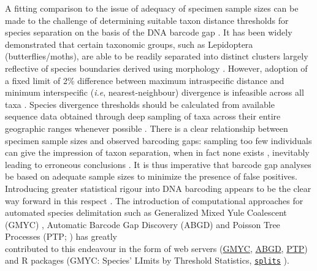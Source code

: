A fitting comparison to the issue of adequacy of specimen sample sizes can be made to the challenge of determining suitable taxon distance thresholds for species separation on the basis of the DNA barcode gap \cite{meyer2005dna}. It has been widely demonstrated that certain taxonomic groups, such as Lepidoptera (butterflies/moths), are able to be readily separated into distinct clusters largely reflective of species boundaries derived using morphology \cite{candek2015dna}. However, adoption of a fixed limit of 2\% difference between maximum intraspecific distance and minimum interspecific (\textit{i.e}, nearest-neighbour) divergence is infeasible across all taxa \cite{collins2013seven, hebert2003barcoding}. Species divergence thresholds should be calculated from available \\ sequence data obtained through deep sampling of taxa across their entire geographic ranges whenever possible \cite{young2017barcode}. There is a clear relationship between specimen sample sizes and observed barcoding gaps: sampling too few individuals can give the impression of taxon separation, when in fact none exists \cite{candek2015dna, dasmahapatra2010mitochondrial, hickerson2006dna, meyer2005dna, wiemers2007does}, inevitably leading to erroneous conclusions \cite{collins2013seven}. It is thus imperative that barcode gap analyses be based on adequate sample sizes to minimize the presence of false positives. Introducing greater statistical rigour into DNA barcoding appears to be the clear way forward in this respect \cite{candek2015dna, luo2015simulation, nielsen2006statistical, phillips2019incomplete}. The introduction of computational approaches for automated species delimitation such as Generalized Mixed Yule Coalescent (GMYC) \cite{fujisawa2013delimiting, monaghan2009accelerated, pons2006sequence}, Automatic Barcode Gap Discovery (ABGD) \cite{puillandre2011abgd} and Poisson Tree Processes (PTP; \cite{zhang2013general}) has greatly \\ contributed to this endeavour in the form of web servers (\href{https://species.h-its.org/gmyc/}{GMYC}, \href{http://wwwabi.snv.jussieu.fr/public/abgd/abgdweb.html}{ABGD}, \href{https://species.h-its.org/ptp/}{PTP}) and R packages (GMYC: Species' LImits by Threshold Statistics, \href{https://r-forge.r-project.org/projects/splits/}{\tt splits} \cite{ezard2017splits}).



